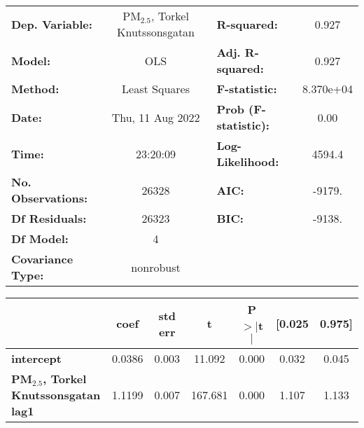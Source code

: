 \begin{landscape}
\begin{table}[h]
\begin{center}
\begin{tabular}{lclc}
\toprule
\textbf{Dep. Variable:}                            & PM$_{2.5}$, Torkel Knutssonsgatan & \textbf{  R-squared:         } &     0.927   \\
\textbf{Model:}                                    &                 OLS                  & \textbf{  Adj. R-squared:    } &     0.927   \\
\textbf{Method:}                                   &            Least Squares             & \textbf{  F-statistic:       } & 8.370e+04   \\
\textbf{Date:}                                     &           Thu, 11 Aug 2022           & \textbf{  Prob (F-statistic):} &     0.00    \\
\textbf{Time:}                                     &               23:20:09               & \textbf{  Log-Likelihood:    } &    4594.4   \\
\textbf{No. Observations:}                         &                 26328                & \textbf{  AIC:               } &    -9179.   \\
\textbf{Df Residuals:}                             &                 26323                & \textbf{  BIC:               } &    -9138.   \\
\textbf{Df Model:}                                 &                     4                & \textbf{                     } &             \\
\textbf{Covariance Type:}                          &              nonrobust               & \textbf{                     } &             \\
\bottomrule
\end{tabular}
\begin{tabular}{lcccccc}
                                                   & \textbf{coef} & \textbf{std err} & \textbf{t} & \textbf{P$> |$t$|$} & \textbf{[0.025} & \textbf{0.975]}  \\
\midrule
\textbf{intercept}                                 &       0.0386  &        0.003     &    11.092  &         0.000        &        0.032    &        0.045     \\
\textbf{PM$_{2.5}$, Torkel Knutssonsgatan lag1} &       1.1199  &        0.007     &   167.681  &         0.000        &        1.107    &        1.133     \\

\end{tabular}
\end{center}
\end{table}
\end{landscape}
